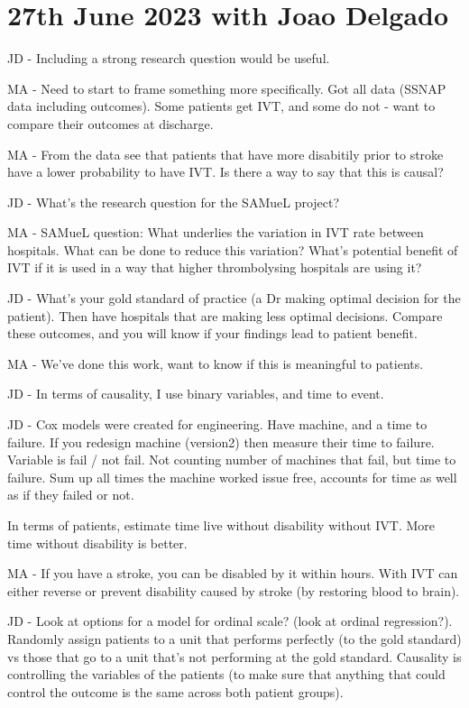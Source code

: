 \section{27th June 2023 with Joao Delgado}

JD - Including a strong research question would be useful.

MA - Need to start to frame something more specifically. Got all data (SSNAP data including outcomes). Some patients get IVT, and some do not - want to compare their outcomes at discharge.

MA - From the data see that patients that have more disabitily prior to stroke have a lower probability to have IVT. Is there a way to say that this is causal?

JD - What's the research question for the SAMueL project?

MA - SAMueL question: What underlies the variation in IVT rate between hospitals. What can be done to reduce this variation? What's potential benefit of IVT if it is used in a way that higher thrombolysing hospitals are using it?

JD - What's your gold standard of practice (a Dr making optimal decision for the patient). Then have hospitals that are making less optimal decisions. Compare these outcomes, and you will know if your findings lead to patient benefit.

MA - We've done this work, want to know if this is meaningful to patients.

JD - In terms of causality, I use binary variables, and time to event.

JD - Cox models were created for engineering. Have machine, and a time to failure. If you redesign machine (version2) then measure their time to failure. Variable is fail / not fail. Not counting number of machines that fail, but time to failure. Sum up all times the machine worked issue free, accounts for time as well as if they failed or not.

In terms of patients, estimate time live without disability without IVT. More time without disability is better.

MA - If you have a stroke, you can be disabled by it within hours. With IVT can either reverse or prevent disability caused by stroke (by restoring blood to brain).

JD - Look at options for a model for ordinal scale? (look at ordinal regression?). Randomly assign patients to a unit that performs perfectly (to the gold standard) vs those that go to a unit that's not performing at the gold standard. Causality is controlling the variables of the patients (to make sure that anything that could control the outcome is the same across both patient groups).

